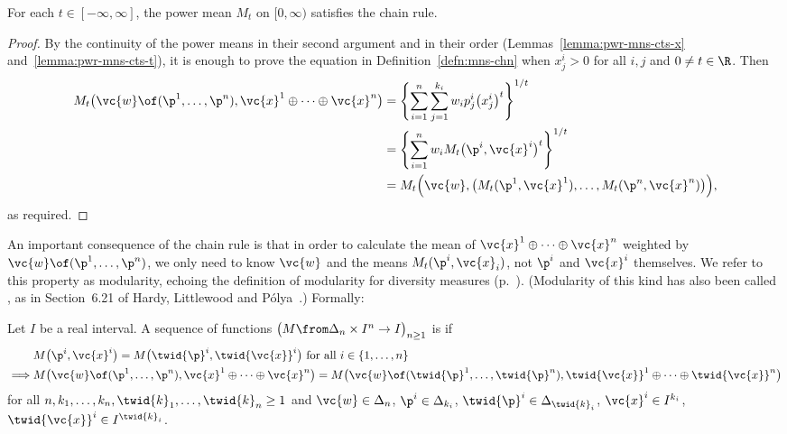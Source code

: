 \begin{propn}
%
%
% 
For each $t \in [-\infty, \infty]$, the power mean $M_t$ on $[0, \infty)$
satisfies the chain rule.
\end{propn}

\begin{proof}
By the continuity of the power means in their second argument and in their
order (Lemmas~\ref{lemma:pwr-mns-cts-x} and~\ref{lemma:pwr-mns-cts-t}), it
is enough to prove the equation in Definition~\ref{defn:mns-chn} when
$x^i_j > 0$ for all $i, j$ and $0 \neq t \in \R$.  Then
% 
\begin{align*}
M_t\bigl(\vc{w} \of (\p^1, \ldots, \p^n), 
\vc{x}^1 \oplus\cdots\oplus \vc{x}^n \bigr)   &
=
\Biggl\{ 
\sum_{i = 1}^n \sum_{j = 1}^{k_i} w_i p^i_j \bigl(x^i_j\bigr)^t     
\Biggr\}^{1/t}  \\
&
=
\Biggl\{
\sum_{i = 1}^n w_i M_t\bigl(\p^i, \vc{x}^i\bigr)^t        
\Biggr\}^{1/t}  \\
&
=
M_t \Bigl( \vc{w}, 
\bigl( M_t(\p^1, \vc{x}^1), \ldots, M_t(\p^n, \vc{x}^n) \bigr) 
\Bigr),
\end{align*}
% 
as required.
\end{proof}

An important consequence of the chain rule is that in order to calculate
the mean of $\vc{x}^1 \oplus\cdots\oplus \vc{x}^n$ weighted by $\vc{w} \of
(\p^1, \ldots, \p^n)$, we only need to know $\vc{w}$ and the means
$M_t(\p^i, \vc{x}_i)$, not $\p^i$ and $\vc{x}^i$ themselves.  We
refer to this property as modularity, echoing the definition of
modularity for diversity measures (p.~\pageref{p:D-mod}).  (Modularity of this
kind has also been called ,%
% 
% 
as in Section~6.21 of Hardy, Littlewood and P\'olya~\cite{HLP}.)  Formally:

\begin{defn}
%
% 
%
Let $I$ be a real interval.  A sequence of functions $\bigl( M \from
\Delta_n \times I^n \to I \bigr)_{n \geq 1}$ is  if
% 
\begin{align*}
&
M\bigl(\p^i, \vc{x}^i \bigr) 
= 
M\bigl(\twid{\p}^i, \twid{\vc{x}}^i\bigr) 
\text{ for all } i \in \{1, \ldots, n\}     \\
\implies
&
M\bigl( \vc{w} \of (\p^1, \ldots, \p^n), 
\vc{x}^1 \oplus\cdots\oplus \vc{x}^n  \bigr) =
M\bigl( \vc{w} \of (\twid{\p}^1, \ldots, \twid{\p}^n),
\twid{\vc{x}}^1 \oplus\cdots\oplus \twid{\vc{x}}^n  \bigr) 
\end{align*}
% 
for all $n, k_1, \ldots, k_n, \twid{k}_1, \ldots, \twid{k}_n \geq 1$ and
$\vc{w} \in \Delta_n$, $\p^i \in \Delta_{k_i}$, $\twid{\p}^i \in
\Delta_{\twid{k}_i}$, $\vc{x}^i \in I^{k_i}$, $\twid{\vc{x}}^i \in
I^{\twid{k}_i}$.   
\end{defn}

